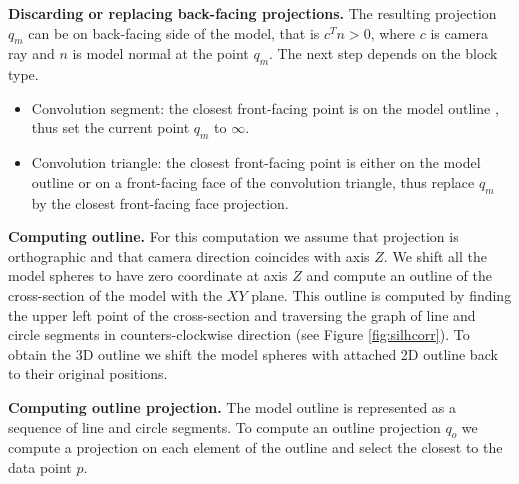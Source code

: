 \textbf{Discarding or replacing back-facing projections.}
The resulting projection $q_m$ can be on back-facing side of the model, that is $c^{T} n > 0$, where $c$ is camera ray and $n$ is model normal at the point $q_m$.
The next step depends on the block type. 
\begin{itemize}
	\item Convolution segment: the closest front-facing point is on the model outline , thus set the current point $q_m$ to $\infty$.
	\item Convolution triangle: the closest front-facing point is either on the model outline or on a front-facing face of the convolution triangle, thus replace $q_m$ by the closest front-facing face projection.
\end{itemize}

\textbf{Computing outline.}
For this computation we assume that projection is orthographic and that camera direction coincides with axis $Z$. We shift all the model spheres to have zero coordinate at axis $Z$ and compute an outline of the cross-section of the model with the $XY$ plane. This outline is computed by finding the upper left point of the cross-section and traversing the graph of line and circle segments in counters-clockwise direction (see Figure \ref{fig:silhcorr}). To obtain the 3D outline we shift the model spheres with attached 2D outline back to their original positions.




\textbf{Computing outline projection.}
The model outline is represented as a sequence of line and circle segments. To compute an outline projection $q_o$ we compute a projection on each element of the outline and select the closest to the data point $p$.